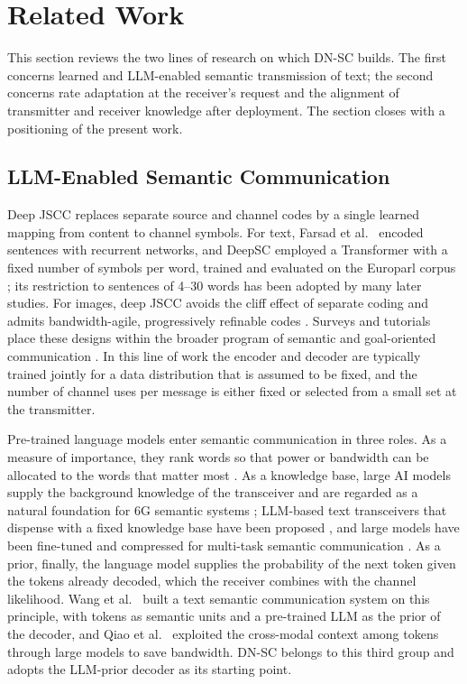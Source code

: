 \section{Related Work}
\label{sec:related}

This section reviews the two lines of research on which DN-SC builds. The first concerns learned and LLM-enabled semantic transmission of text; the second concerns rate adaptation at the receiver's request and the alignment of transmitter and receiver knowledge after deployment. The section closes with a positioning of the present work.

\subsection{LLM-Enabled Semantic Communication}
\label{sec:related-llm}

Deep JSCC replaces separate source and channel codes by a single learned mapping from content to channel symbols. For text, Farsad et al.\ \cite{farsad2018} encoded sentences with recurrent networks, and DeepSC \cite{xie2021deepsc} employed a Transformer \cite{vaswani2017} with a fixed number of symbols per word, trained and evaluated on the Europarl corpus \cite{koehn2005}; its restriction to sentences of 4--30 words has been adopted by many later studies. For images, deep JSCC avoids the cliff effect of separate coding \cite{bourtsoulatze2019} and admits bandwidth-agile, progressively refinable codes \cite{kurka2021}. Surveys and tutorials place these designs within the broader program of semantic and goal-oriented communication \cite{strinati2021,gunduz2023,luo2022,kountouris2021}. In this line of work the encoder and decoder are typically trained jointly for a data distribution that is assumed to be fixed, and the number of channel uses per message is either fixed or selected from a small set at the transmitter.

Pre-trained language models enter semantic communication in three roles. As a measure of importance, they rank words so that power or bandwidth can be allocated to the words that matter most \cite{guo2023importance}. As a knowledge base, large AI models supply the background knowledge of the transceiver and are regarded as a natural foundation for 6G semantic systems \cite{jiang2024largeai,xie2025largemodel,bariah2024}; LLM-based text transceivers that dispense with a fixed knowledge base have been proposed \cite{chen2025llmsc}, and large models have been fine-tuned and compressed for multi-task semantic communication \cite{ni2025multitask}. As a prior, finally, the language model supplies the probability of the next token given the tokens already decoded, which the receiver combines with the channel likelihood. Wang et al.\ \cite{wang2024llmsc} built a text semantic communication system on this principle, with tokens as semantic units and a pre-trained LLM as the prior of the decoder, and Qiao et al.\ \cite{qiao2025token} exploited the cross-modal context among tokens through large models to save bandwidth. DN-SC belongs to this third group and adopts the LLM-prior decoder as its starting point.

